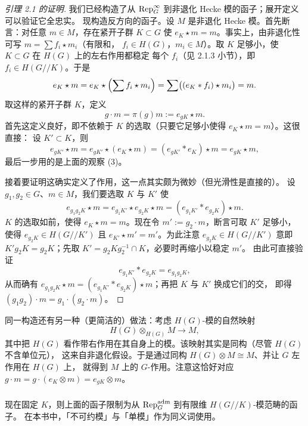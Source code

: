 \begin{proof}[引理 2.1 的证明]
我们已经构造了从 $\mathrm{Rep}^{\infty}_G$ 到非退化 Hecke 模的函子；展开定义可以验证它全忠实。
现构造反方向的函子。设 $M$ 是非退化 Hecke 模。首先断言：对任意 $m\in M$，存在紧开子群
$K\subset G$ 使 $e_K\star m=m$。事实上，由非退化性可写 $m=\sum f_i\star m_i$（有限和，
$f_i\in H(G)$，$m_i\in M$）。取 $K$ 足够小，使 $K\subset G$ 在 $H(G)$ 上的左右作用都稳定
每个 $f_i$（见 2.1.3 小节），即 $f_i\in H(G/\!/K)$。于是
\[
e_K\star m=e_K\star\Bigl(\sum f_i\star m_i\Bigr)
=\sum\bigl((e_K*f_i)\star m_i\bigr)=m .
\]
取这样的紧开子群 $K$，定义
\[
g\cdot m=\pi(g)m:=e_{gK}\star m .
\]
首先这定义良好，即不依赖于 $K$ 的选取（只要它足够小使得 $e_K\star m=m$）。这很直接：
设 $K'\subset K$，则
\[
e_{gK'}\star m=e_{gK'}\star(e_K\star m)=(e_{gK'}*e_K)\star m=e_{gK}\star m,
\]
最后一步用的是上面的观察 (3)。

接着要证明这确实定义了作用，这一点其实颇为微妙（但光滑性是直接的）。
设 $g_1,g_2\in G$、$m\in M$，我们要选取 $K$ 与 $K'$ 使
\[
e_{g_1g_2K}\star m=e_{g_1K'}\star e_{g_2K}\star m
=(e_{g_1K'}*e_{g_2K})\star m .
\]
$K$ 的选取如前，使得 $e_K\star m=m$。现在令 $m':=g_2\cdot m$，断言可取 $K'$ 足够小，
使得 $e_{g_2K}\in H(G/\!/K')$ 且 $e_{K'}\star m'=m'$。为此注意 $e_{g_2K}\in H(G/\!/K')$
意即 $K'g_2K=g_2K$；先取 $K'=g_2Kg_2^{-1}\cap K$，必要时再缩小以稳定 $m'$。
由此可直接验证
\[
e_{g_1K'}*e_{g_2K}=e_{g_1g_2K},
\]
从而确有 $e_{g_1g_2K}\star m=(e_{g_1K'}*e_{g_2K})\star m$；再把 $K$ 与 $K'$ 换成它们的交，
即得 $(g_1g_2)\cdot m=g_1\cdot(g_2\cdot m)$。
\end{proof}

\begin{remark}
同一构造还有另一种（更简洁的）做法：考虑 $H(G)$-模的自然映射
\[
H(G)\otimes_{H(G)}M\longrightarrow M,
\]
其中把 $H(G)$ 看作带右作用在其自身上的模。该映射其实是同构（尽管 $H(G)$ 不含单位元），
这来自非退化假设。于是通过同构 $H(G)\otimes M\cong M$、并让 $G$ 左作用在 $H(G)$ 上，
就得到 $M$ 上的 $G$-作用。注意这恰好对应
$g\cdot m=g\cdot(e_K\otimes m)=e_{gK}\otimes m$。
\end{remark}

\subsubsection{}

现在固定 $K$，则上面的函子限制为从 $\mathrm{Rep}^{\mathrm{adm}}_G$ 到有限维 $H(G/\!/K)$-模范畴的函子。
在本书中，「不可约模」与「单模」作为同义词使用。

